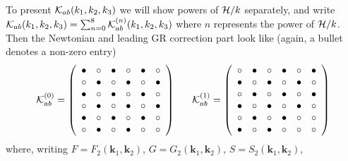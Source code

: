 To present $\mathcal{K}_{ab}(k_1,k_2,k_3)$ we will show powers of ${\cal H}/k$ separately, and write $\mathcal{K}_{ab}(k_1,k_2,k_3)=\sum_{n=0}^8 \mathcal{K}_{ab}^{(n)}(k_1,k_2,k_3)$ where $n$ represents the power of ${\cal H}/k$.  Then the Newtonian and leading GR correction  part look like (again, a bullet denotes a non-zero entry)
\begin{equation}         
  \mathcal{K}_{ab}^{(0)} = \left( \begin {array}{cccccc} 
 \bullet&\circ &\bullet&\circ &\bullet&\circ \\ 
  \circ &\bullet&\circ &\bullet &\circ &\bullet\\ 
   \bullet&\circ &\bullet&\circ &\bullet&\circ \\ 
    \circ &\bullet&\circ &\bullet&\circ &\bullet\\ 
 \bullet&\circ &\bullet&\circ &\bullet&\circ \\ 
  \circ &\bullet&\circ &\bullet&\circ &\circ 
\end {array} \right)~~~~~ 
\mathcal{K}_{ab}^{(1)} = \left( \begin {array}{cccccc} 
  \circ&\bullet&\circ&\bullet&\circ&\bullet\\ \bullet&\circ&\bullet&\circ
&\bullet&\circ\\ \circ&\bullet&\circ&\bullet&\circ&\bullet\\ \bullet&\circ&\bullet&\circ&\bullet&\circ
\\ \circ&\bullet&\circ&\bullet&\circ&\circ\\ \bullet&\circ&\bullet&\circ&\circ&\circ
\end {array}
  \right)
\end{equation}
where, writing $F=F_2(\bm k_1,\bm k_2)$, $G=G_2(\bm k_1,\bm k_2)$, $S=S_2(\bm k_1,\bm k_2)$,  
